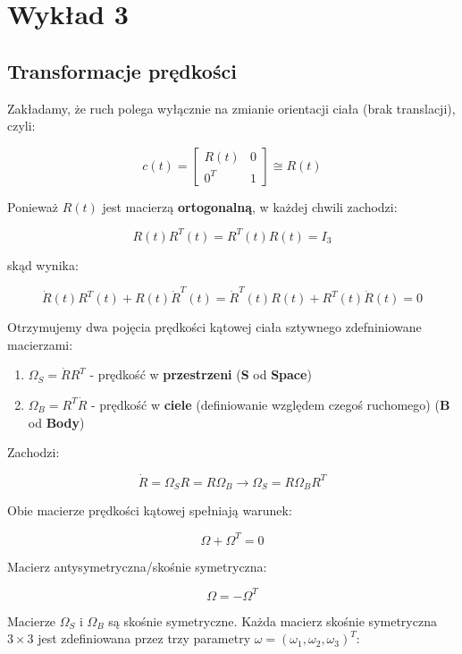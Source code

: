 \documentclass{article}
\begin{document}
\newpage

\section{Wykład 3}

\subsection{Transformacje prędkości}

Zakładamy, że ruch polega wyłącznie na zmianie orientacji ciała (brak translacji), czyli:

$$
    c\left(t\right)=
    \begin{bmatrix}
        R(t)  & 0 \\[0.3em]
        0^{T} & 1
    \end{bmatrix}
    \cong
    R(t)
$$

Ponieważ $R(t)$ jest macierzą {\bf ortogonalną}, w każdej chwili zachodzi:

$$
    R(t)R^{T}(t)=R^{T}(t)R(t)=I_{3}
$$

skąd wynika:

$$
    \dot R(t)R^{T}(t)+R(t)\dot R^{T}(t)=\dot R^{T}(t)R(t)+R^{T}(t)\dot R(t)=0
$$

Otrzymujemy dwa pojęcia prędkości kątowej ciała sztywnego zdefniniowane macierzami:

\begin{enumerate}
    \item $\Omega_{S}=\dot R R^{T}$ - prędkość w {\bf przestrzeni} ({\bf S} od {\bf Space})
    \item $\Omega_{B}=R^{T} \dot R$ - prędkość w {\bf ciele} (definiowanie względem czegoś ruchomego) ({\bf B} od {\bf Body})
\end{enumerate}


Zachodzi:

$$
    \dot R =\Omega_{S}R=R\Omega_{B} \rightarrow \Omega_{S}=R\Omega_{B}R^{T}
$$

Obie macierze prędkości kątowej spełniają warunek:

$$
    \Omega+\Omega^{T}=0
$$

Macierz antysymetryczna/skośnie symetryczna:

$$
    \Omega = -\Omega^{T}
$$


Macierze $\Omega_{S}$ i $\Omega_{B}$ są skośnie symetryczne. Każda macierz skośnie symetryczna $3\times3$ jest zdefiniowana przez trzy parametry $\omega = \left(\omega_{1}, \omega_{2}, \omega_{3}\right)^{T}$:
\end{document}

